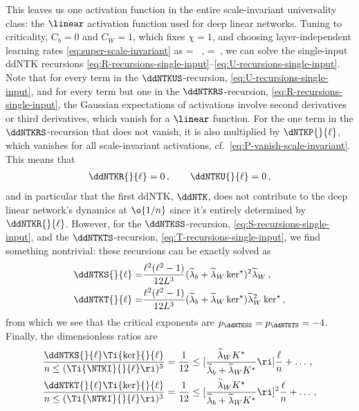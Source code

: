This leaves us one activation function in the entire scale-invariant universality class: the $\linear$ activation function used for deep linear networks. Tuning to criticality, $C_b =0$ and $C_W = 1$, which fixes $\chi=1$, and choosing layer-independent learning rates \eqref{eq:super-scale-invariant} as 
\be\label{eq:learning-rate-EP-scale-invariant-reprint-for-ddNTKs}
\Lb{\ell} =  \, , \qquad \LW{\ell} =   \,,
\ee
we can solve the single-input ddNTK recursions \eqref{eq:R-recursions-single-input}--\eqref{eq:U-recursions-single-input}. Note that  for every term in the $\ddNTKUS$-recursion, \eqref{eq:U-recursions-single-input}, and for every term but one in the $\ddNTKRS$-recursion, \eqref{eq:R-recursions-single-input}, the Gaussian expectations of activations involve second derivatives or third derivatives, which vanish for a $\linear$ function. For the one term in the $\ddNTKRS$-recursion that does not vanish, it is also multiplied by $\dNTKP{}{\ell}$, which vanishes for all scale-invariant activations, cf.~\eqref{eq:P-vanish-scale-invariant}. This means that 
\begin{align}
\ddNTKR{}{\ell}=0\, ,\qquad \ddNTKU{}{\ell}=0\, ,
\end{align}
and in particular that the first ddNTK, $\ddNTK$, does not contribute to the deep linear network's dynamics at $\o{1/n}$ since it's entirely determined by $\ddNTKR{}{\ell}$.
However, for the $\ddNTKSS$-recursion, \eqref{eq:S-recursions-single-input}, and the $\ddNTKTS$-recursion, \eqref{eq:T-recursions-single-input}, we find something nontrivial: these recursions can be exactly solved as
\begin{align}
\ddNTKS{}{\ell}=&\frac{\ell^2(\ell^2-1)}{12L^3} (\widetilde{\lambda}_b+\widetilde{\lambda}_W \ker^{\star})^2\widetilde{\lambda}_W \, ,\\
\ddNTKT{}{\ell}=&\frac{\ell^2(\ell^2-1)}{12L^3} (\widetilde{\lambda}_b+\widetilde{\lambda}_W \ker^{\star}) \widetilde{\lambda}_W^2 \ker^{\star}\, ,
\end{align}
from which we see that the critical exponents are $p_\ddNTKSS = p_\ddNTKTS = -4$. 
Finally, the dimensionless ratios are 
\begin{align}\label{eq:scaling-relations-ddNTK-DLN}
\frac{\ddNTKS{}{\ell} \Ti{\ker}{}{\ell}}{n \le( \Ti{\NTKI}{}{\ell} \ri)^3 } &= \frac{1}{12}\le[\frac{\widetilde{\lambda}_W K^\star}{\widetilde{\lambda}_b + \widetilde{\lambda}_W K^\star } \ri] \frac{\ell}{n} + \dots\,, \\
\frac{\ddNTKT{}{\ell}\Ti{\ker}{}{\ell}}{n \le( \Ti{\NTKI}{}{\ell} \ri)^3} &= \frac{1}{12}\le[ \frac{\widetilde{\lambda}_W K^\star }{ \widetilde{\lambda}_b + \widetilde{\lambda}_W K^\star } \ri]^2 \frac{\ell}{n} + \dots \, ,
\end{align}

